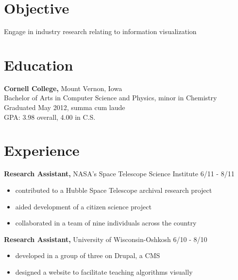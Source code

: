 \documentclass[margin]{res}
\begin{document}
 

\address{mckennapsean@gmail.com \\ 715-203-1040 }
\address{1128 4th Avenue \\ Salt Lake City, UT 84103 }
 
\begin{resume} 


\section{Objective}
Engage in industry research relating to information visualization


\section{Education}
{\bf Cornell College,} Mount Vernon, Iowa \\
Bachelor of Arts in Computer Science and Physics, minor in Chemistry \\
Graduated May 2012, summa cum laude \\%
GPA: 3.98 overall, 4.00 in C.S.


\section{Experience}

{\bf Research Assistant,} NASA's Space Telescope Science Institute \hfill 6/11 - 8/11
\begin{itemize} \itemsep -2pt  %
  \item contributed to a Hubble Space Telescope archival research project
  \item aided development of a citizen science project
  \item collaborated in a team of nine individuals across the country
\end{itemize}

{\bf Research Assistant,} University of Wisconsin-Oshkosh \hfill 6/10 - 8/10
\begin{itemize} \itemsep -2pt  %
  \item developed in a group of three on Drupal, a CMS
  \item designed a website to facilitate teaching algorithms visually
\end{itemize}


\end{resume}
\end{document}
